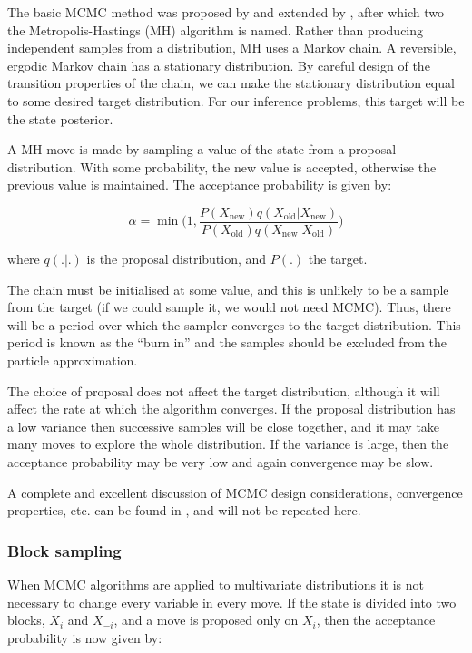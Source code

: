 The basic MCMC method was proposed by \cite{Metropolis1953} and extended by \cite{Hastings1970}, after which two the Metropolis-Hastings (MH) algorithm is named. Rather than producing independent samples from a distribution, MH uses a Markov chain. A reversible, ergodic Markov chain has a stationary distribution. By careful design of the transition properties of the chain, we can make the stationary distribution equal to some desired target distribution. For our inference problems, this target will be the state posterior.

A MH move is made by sampling a value of the state from a proposal distribution. With some probability, the new value is accepted, otherwise the previous value is maintained. The acceptance probability is given by:

\begin{equation}
\alpha = \min \bigg ( 1,  \frac{ P(X_{\text{new}}) q(X_{\text{old}}|X_{\text{new}}) }{ P(X_{\text{old}}) q(X_{\text{new}}|X_{\text{old}}) }  \bigg )
\label{eq:}
\end{equation}

where $q(.|.)$ is the proposal distribution, and $P(.)$ the target.

The chain must be initialised at some value, and this is unlikely to be a sample from the target (if we could sample it, we would not need MCMC). Thus, there will be a period over which the sampler converges to the target distribution. This period is known as the ``burn in'' and the samples should be excluded from the particle approximation.

The choice of proposal does not affect the target distribution, although it will affect the rate at which the algorithm converges. If the proposal distribution has a low variance then successive samples will be close together, and it may take many moves to explore the whole distribution. If the variance is large, then the acceptance probability may be very low and again convergence may be slow.

A complete and excellent discussion of MCMC design considerations, convergence properties, etc. can be found in \cite{Gilks1996}, and will not be repeated here.

\subsubsection{Block sampling}
When MCMC algorithms are applied to multivariate distributions it is not necessary to change every variable in every move. If the state is divided into two blocks, $X_i$ and $X_{-i}$, and a move is proposed only on $X_i$, then the acceptance probability is now given by:

